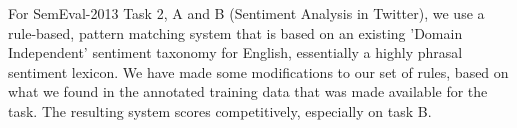 For SemEval-2013 Task 2, A and B (Sentiment Analysis in Twitter), we use a rule-based, pattern matching system that is based on an existing 'Domain
 Independent' sentiment taxonomy for English, essentially a highly phrasal
 sentiment lexicon.  We have made some modifications to our set of rules, based
 on what we found in the annotated training data that was made available for the
 task. The resulting system scores competitively, especially on task B.

